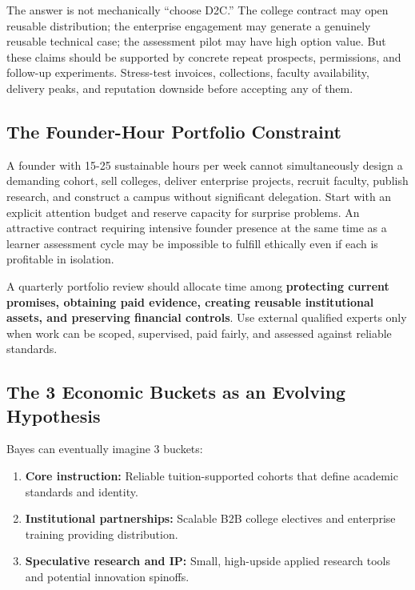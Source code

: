 The answer is not mechanically ``choose D2C.'' The college contract may open reusable distribution; the enterprise engagement may generate a genuinely reusable technical case; the assessment pilot may have high option value. But these claims should be supported by concrete repeat prospects, permissions, and follow-up experiments. Stress-test invoices, collections, faculty availability, delivery peaks, and reputation downside before accepting any of them.

\subsection{The Founder-Hour Portfolio Constraint}
\label{sec:founder_hour_portfolio_constraint}

A founder with 15-25 sustainable hours per week cannot simultaneously design a demanding cohort, sell colleges, deliver enterprise projects, recruit faculty, publish research, and construct a campus without significant delegation. Start with an explicit attention budget and reserve capacity for surprise problems. An attractive contract requiring intensive founder presence at the same time as a learner assessment cycle may be impossible to fulfill ethically even if each is profitable in isolation.

A quarterly portfolio review should allocate time among \textbf{protecting current promises, obtaining paid evidence, creating reusable institutional assets, and preserving financial controls}. Use external qualified experts only when work can be scoped, supervised, paid fairly, and assessed against reliable standards.

\subsection{The 3 Economic Buckets as an Evolving Hypothesis}
\label{sec:three_economic_buckets_evolving_hypothesis}

Bayes can eventually imagine 3 buckets:
\begin{enumerate}
    \item \textbf{Core instruction:} Reliable tuition-supported cohorts that define academic standards and identity.
    \item \textbf{Institutional partnerships:} Scalable B2B college electives and enterprise training providing distribution.
    \item \textbf{Speculative research and IP:} Small, high-upside applied research tools and potential innovation spinoffs.
\end{enumerate}

